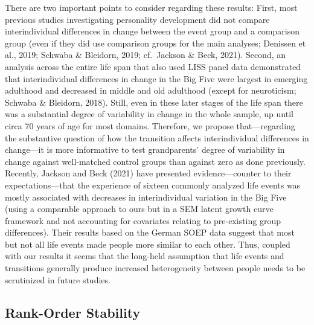 \documentclass[
  english,
  man, noextraspace]{apa7}
\begin{document}
There are two important points to consider regarding these results: First, most previous studies investigating personality development did not compare interindividual differences in change between the event group and a comparison group (even if they did use comparison groups for the main analyses; Denissen et al., 2019; Schwaba \& Bleidorn, 2019; cf.~Jackson \& Beck, 2021). Second, an analysis across the entire life span that also used LISS panel data demonstrated that interindividual differences in change in the Big Five were largest in emerging adulthood and decreased in middle and old adulthood (except for neuroticism; Schwaba \& Bleidorn, 2018). Still, even in these later stages of the life span there was a substantial degree of variability in change in the whole sample, up until circa 70 years of age for most domains. Therefore, we propose that---regarding the substantive question of how the transition affects interindividual differences in change---it is more informative to test grandparents' degree of variability in change against well-matched control groups than against zero as done previously.\\
Recently, Jackson and Beck (2021) have presented evidence---counter to their expectations---that the experience of sixteen commonly analyzed life events was mostly associated with decreases in interindividual variation in the Big Five (using a comparable approach to ours but in a SEM latent growth curve framework and not accounting for covariates relating to pre-existing group differences). Their results based on the German SOEP data suggest that most but not all life events made people more similar to each other. Thus, coupled with our results it seems that the long-held assumption that life events and transitions generally produce increased heterogeneity between people needs to be scrutinized in future studies.

\hypertarget{rank-order-stability-1}{%
\subsection{Rank-Order Stability}\label{rank-order-stability-1}}
\end{document}
